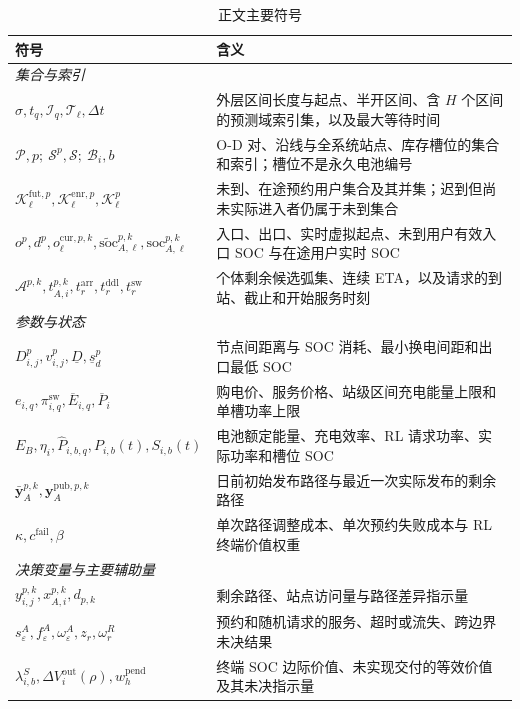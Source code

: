 \documentclass[12pt,a4paper,UTF8]{ctexart}
\begin{document}
\begin{table}[!htbp]
  \centering
  \caption{正文主要符号}
  \label{tab:notation}
  \small
  \setlength{\tabcolsep}{3pt}
  \renewcommand{\arraystretch}{0.98}
  \begin{tabular}{@{}lp{11cm}@{}}
    \toprule
    \textbf{符号} & \textbf{含义} \\
    \midrule
    \multicolumn{2}{l}{\textit{集合与索引}} \\
    $\sigma,t_q,\mathcal I_q,\mathcal T_\ell,\Delta t$ & 外层区间长度与起点、半开区间、含 $H$ 个区间的预测域索引集，以及最大等待时间 \\
    $\mathcal P,p;\ \mathcal S^p,\mathcal S;\ \mathcal B_i,b$ & O-D 对、沿线与全系统站点、库存槽位的集合和索引；槽位不是永久电池编号 \\
    $\mathcal K_\ell^{\mathrm{fut},p},\mathcal K_\ell^{\mathrm{enr},p},\mathcal K_\ell^p$ & 未到、在途预约用户集合及其并集；迟到但尚未实际进入者仍属于未到集合 \\
    $o^p,d^p,o_\ell^{\mathrm{cur},p,k},\widetilde{\mathrm{soc}}_{A,\ell}^{p,k},\mathrm{soc}_{A,\ell}^{p,k}$ & 入口、出口、实时虚拟起点、未到用户有效入口 SOC 与在途用户实时 SOC \\
    $\mathcal A^{p,k},t_{A,i}^{p,k},t_r^{\mathrm{arr}},t_r^{\mathrm{ddl}},t_r^{\mathrm{sw}}$ & 个体剩余候选弧集、连续 ETA，以及请求的到站、截止和开始服务时刻 \\
    \midrule
    \multicolumn{2}{l}{\textit{参数与状态}} \\
    $D_{i,j}^{p},v_{i,j}^{p},\underline D,\underline s_d^p$ & 节点间距离与 SOC 消耗、最小换电间距和出口最低 SOC \\
    $e_{i,q},\pi_{i,q}^{\mathrm{sw}},\overline E_{i,q},\overline P_i$ & 购电价、服务价格、站级区间充电能量上限和单槽功率上限 \\
    $E_B,\eta_i,\widehat P_{i,b,q},P_{i,b}(t),S_{i,b}(t)$ & 电池额定能量、充电效率、RL 请求功率、实际功率和槽位 SOC \\
    $\bar{\mathbf y}_{A}^{p,k},\mathbf y_{A}^{\mathrm{pub},p,k}$ & 日前初始发布路径与最近一次实际发布的剩余路径 \\
    $\kappa,c^{\mathrm{fail}},\beta$ & 单次路径调整成本、单次预约失败成本与 RL 终端价值权重 \\
    \midrule
    \multicolumn{2}{l}{\textit{决策变量与主要辅助量}} \\
    $y_{i,j}^{p,k},x_{A,i}^{p,k},d_{p,k}$ & 剩余路径、站点访问量与路径差异指示量 \\
    $s_\varepsilon^A,f_\varepsilon^A,\omega_\varepsilon^A,z_r,\omega_r^R$ & 预约和随机请求的服务、超时或流失、跨边界未决结果 \\
    $\lambda_{i,b}^S,\Delta V_i^{\mathrm{out}}(\rho),w_h^{\mathrm{pend}}$ & 终端 SOC 边际价值、未实现交付的等效价值及其未决指示量 \\
    \bottomrule
  \end{tabular}
\end{table}
\end{document}
